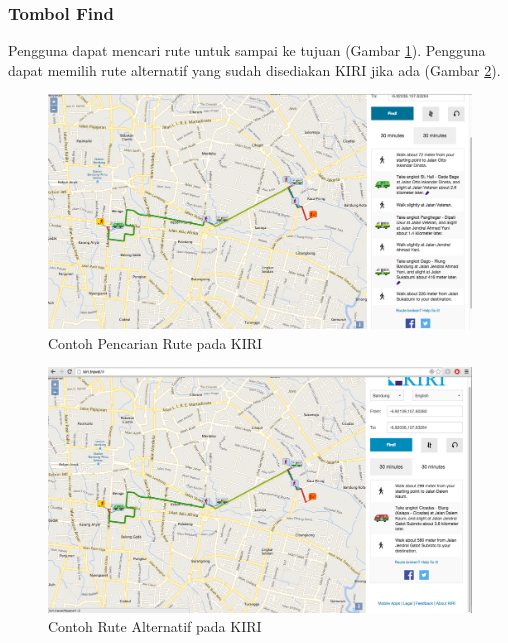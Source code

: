 \subsubsection{Tombol Find}
Pengguna dapat mencari rute untuk sampai ke tujuan (Gambar \ref{fig:3_KIRI_find}). Pengguna dapat memilih rute alternatif yang sudah disediakan KIRI jika ada (Gambar \ref{fig:3_KIRI_find_alternate}).

\begin{figure}[H]
	\centering
	\includegraphics[scale=0.3]{Gambar/KIRI-find}
	\caption{Contoh Pencarian Rute pada KIRI} 
	\label{fig:3_KIRI_find}
\end{figure}

\begin{figure}[H]
	\centering
	\includegraphics[scale=0.3]{Gambar/KIRI-find-alternate}
	\caption{Contoh Rute Alternatif pada KIRI} 
	\label{fig:3_KIRI_find_alternate}
\end{figure}

